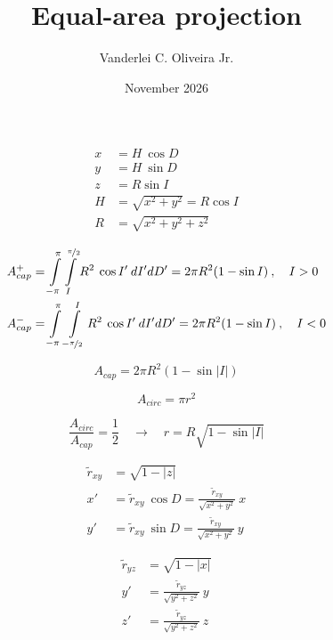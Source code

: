 \documentclass[portuguese,10pt,a4paper,final]{article}%
\title{Equal-area projection}
\author{Vanderlei C. Oliveira Jr.}
\date{November 2026}
\begin{document}
\maketitle

\begin{subequations}
	\begin{align}
		x &= H \: \cos D \\
		y &= H \: \sin D \\
		z &= R \sin I \\
		H &= \sqrt{x^2 + y^2} = R \cos I \\
		R &= \sqrt{x^2 + y^2 + z^2}
	\end{align}
\end{subequations}

\begin{subequations}
	\begin{align}
		A^{+}_{cap} &=
			\int\limits_{-\pi}^{\pi}\int\limits_{I}^{\nicefrac{\pi}{2}}
			R^{2} \: \cos I' \: dI'dD' = 2\pi R^{2} (1 - \sin I) \: , \quad I > 0\\
		A^{-}_{cap} &=
			\int\limits_{-\pi}^{\pi}\int\limits_{-\nicefrac{\pi}{2}}^{I}
			R^{2} \: \cos I' \: dI'dD' = 2\pi R^{2} (1 - \sin I) \: , \quad I < 0
	\end{align}
\end{subequations}

\begin{equation}
	A_{cap} = 2\pi R^{2} (1 - \sin \left| I \right|)
\end{equation}

\begin{equation}
	A_{circ} = \pi r^{2}
\end{equation}

\begin{equation}
	\frac{A_{circ}}{A_{cap}} = \frac{1}{2} \quad \longrightarrow \quad r = R \sqrt{1 - \sin \left| I \right|}
\end{equation}

\begin{subequations}
	\begin{align}
		\tilde{r}_{xy} &= \sqrt{1 - \left| z \right|} \\
		x' &= \tilde{r}_{xy} \: \cos D = \tfrac{\tilde{r}_{xy}}{\sqrt{x^{2} + y^{2}}} \: x \\
		y' &= \tilde{r}_{xy} \: \sin D = \tfrac{\tilde{r}_{xy}}{\sqrt{x^{2} + y^{2}}} \: y
	\end{align}
\end{subequations}

\begin{subequations}
	\begin{align}
		\tilde{r}_{yz} &= \sqrt{1 - \left| x \right|} \\
		y' &= \tfrac{\tilde{r}_{yz}}{\sqrt{y^{2} + z^{2}}} \: y \\
		z' &= \tfrac{\tilde{r}_{yz}}{\sqrt{y^{2} + z^{2}}} \: z
	\end{align}
\end{subequations}
\end{document}
